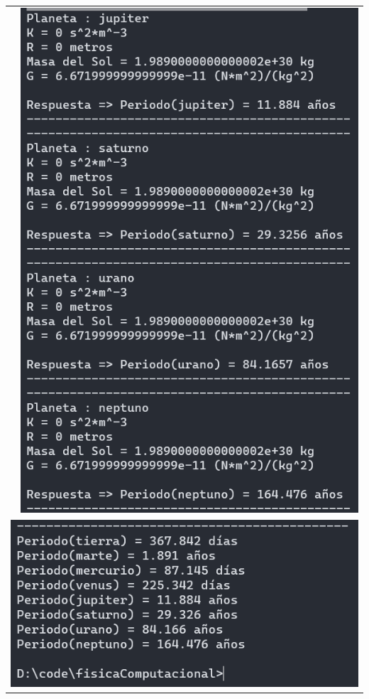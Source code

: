 \documentclass[a4paper,12pt]{article}
\begin{document}
\begin{table}[htbp]
\begin{tabular}{cc}
\begin{minipage}{.3\textwidth}
            \end{minipage}&\begin{minipage}{.3\textwidth}
                \includegraphics[width=\linewidth]{e4_2}
            \end{minipage}\\
            \multicolumn{2}{c}{
            \begin{minipage}{.3\textwidth}
                \includegraphics[width=\linewidth]{e4_3}
            \end{minipage}
            }
        \end{tabular}
    \end{table}
\end{document}
